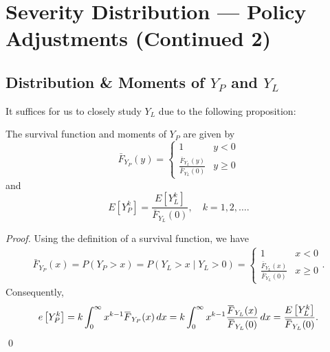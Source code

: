 \documentclass[notoc,notitlepage]{tufte-book}
\begin{document}
\section{Severity Distribution --- Policy Adjustments (Continued 2)}%
\label{sec:severity_distribution_policy_adjustments_continued_2}

\subsection{Distribution \& Moments of $Y_P$ and $Y_L$}%
\label{sub:distribution_n_moments_of_y_p_and_y_l_}

It suffices for us to closely study $Y_L$ due to the following proposition:

\begin{propo}\label{propo:_y_p_is_completely_determined_by_y_l_}
  The survival function and moments of $Y_P$ are given by
  \begin{equation*}
    \bar{F}_{Y_P}(y) = \begin{cases}
      1                                         & y < 0 \\
      \frac{\bar{F}_{Y_L}(y)}{\bar{F}_{Y_L}(0)} & y \geq 0
    \end{cases}
  \end{equation*}
  and
  \begin{equation*}
    E \left[ Y_P^k \right] = \frac{E \left[ Y_L^k \right]}{\bar{F}_{Y_L}(0)}, \quad k = 1, 2, \ldots .
  \end{equation*}
\end{propo}

\begin{proof}
  Using the definition of a survival function, we have
  \begin{align*}
    \bar{F}_{Y_P}(x) = P(Y_P > x) = P(Y_L > x \mid Y_L > 0) = \begin{cases}
      1                                         & x < 0 \\
      \frac{\bar{F}_{Y_L}(x)}{\bar{F}_{Y_L}(0)} & x \geq 0
    \end{cases}.
  \end{align*}
  Consequently,
  \begin{equation*}
    e \left[ Y_P^k \right] = k \int_{0}^{\infty} x^{k - 1} \bar{F}_{Y_P}(x) \dif{x} = k \int_{0}^{\infty} x^{k - 1} \frac{\bar{F}_{Y_L}(x)}{\bar{F}_{Y_L}(0)} \dif{x} = \frac{E \left[ Y_L^k \right]}{\bar{F}_{Y_L}(0)}.
  \end{equation*}\qed\
\end{proof}
\end{document}
